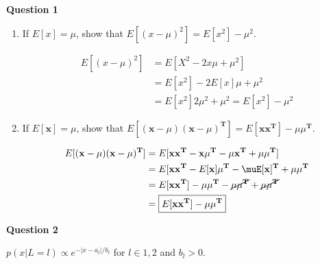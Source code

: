 \documentclass[12pt,A4]{article}
\newcommand{\tpose}{^\mathbf{T}}
\begin{document}
\textbf{Question 1}

\begin{enumerate}
    \item If \( E[x] = \mu\), show that \( E[(x - \mu)^2] = E[x^2] - \mu^2\).
    
    \begin{align*}
            E[(x - \mu)^2] &= E[X^2 - 2x\mu + \mu ^2] \\
            &= E[x^2] - 2E[x]\mu + \mu^2 \\
            &= E[x^2] 2\mu^2 + \mu^2 = \boxed{E[x^2] - \mu^2}
    \end{align*}
    
    \item If \( E[\mathbf{x}] = \mu\), show that \( E[(\mathbf{x} - \mu)(\mathbf{x} - \mu)^\mathbf{T}] = E[\mathbf{xx}^\mathbf{T}] - \mu\mu^\mathbf{T}\). \label{q1p2}
    
    \begin{align*}
            E[(\mathbf{x} - \mu)(\mathbf{x} - \mu)^\mathbf{T}] &= E[\mathbf{xx^T} - \mathbf{x}\mu^\mathbf{T} - \mu\mathbf{x^T} + \mu\mu^\mathbf{T}] \\
            &= E[\mathbf{xx^T} - E[\mathbf{x}]\mu^\mathbf{T} - \muE[\mathbf{x}]^\mathbf{T} + \mu\mu^\mathbf{T} \\
            &= E[\mathbf{xx^T}] - \mu\mu^\mathbf{T} - \cancel{\mu\mu\tpose} + \cancel{\mu\mu\tpose} \\
            &= \boxed{E[ \mathbf{xx}^ \mathbf{T}] - \mu \mu ^ \mathbf{T}}
    \end{align*}
\end{enumerate}

\textbf{Question 2}

\(p(x|L=l) \propto e^{-|x - a_l| / b_l}\) for \(l \in 1, 2\) and \(b_l > 0\).
\end{document}
